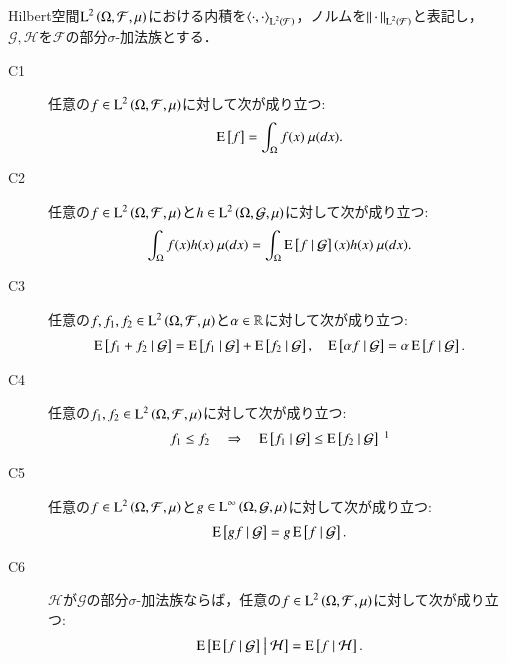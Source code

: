 	\begin{itembox}[l]{}
	\begin{prp}[条件付き期待値作用素の性質]
		Hilbert空間$\operatorname{L}^{2} \left(\Omega, \mathcal{F},\mu\right)$における内積を$\inprod<\cdot,\cdot>_{\Lp{2}{\mathcal{F}}}$，ノルムを$\left\|\, \cdot\, \right\|_{\operatorname{L}^{2} \left(\mathcal{F}\right)}$と表記し，
		$\mathcal{G},\mathcal{H}$を$\mathcal{F}$の部分$\sigma$-加法族とする．
		\begin{description}
			\item[C1] 任意の$f \in \operatorname{L}^{2} \left(\Omega, \mathcal{F},\mu\right)$に対して次が成り立つ:
				\begin{align}
					\operatorname{E} \left[ f \right] = \int_{\Omega} f(x)\ \mu(dx).
				\end{align}
				
			\item[C2]	任意の$f \in \operatorname{L}^{2} \left(\Omega, \mathcal{F},\mu\right)$と$h \in \operatorname{L}^{2} \left(\Omega, \mathcal{G},\mu\right)$に対して次が成り立つ:
				\begin{align}
					\int_{\Omega} f(x)h(x)\ \mu(dx) = \int_{\Omega} \operatorname{E} \left[ f \ \middle|\ \mathcal{G} \right](x)h(x)\ \mu(dx).
				\end{align}
				
			\item[C3]	任意の$f,f_1,f_2 \in \operatorname{L}^{2} \left(\Omega, \mathcal{F},\mu\right)$と$\alpha \in \mathbb{R}$に対して次が成り立つ:
				\begin{align}
					\operatorname{E} \left[ f_1 + f_2 \ \middle|\ \mathcal{G} \right] = \operatorname{E} \left[ f_1 \ \middle|\ \mathcal{G} \right] + \operatorname{E} \left[ f_2 \ \middle|\ \mathcal{G} \right],
					\quad \operatorname{E} \left[ \alpha f \ \middle|\ \mathcal{G} \right] = \alpha \operatorname{E} \left[ f \ \middle|\ \mathcal{G} \right].
				\end{align}

			\item[C4]	任意の$f_1,f_2 \in \operatorname{L}^{2} \left(\Omega, \mathcal{F},\mu\right)$に対して次が成り立つ:
				\begin{align}
					f_1 \leq f_2 \quad \Rightarrow \quad \cexp{f_1}{\mathcal{G}} \leq \cexp{f_2}{\mathcal{G}} \ \footnotemark
				\end{align}
			
			\item[C5]	任意の$f \in \operatorname{L}^{2} \left(\Omega, \mathcal{F},\mu\right)$と$g \in \operatorname{L}^{\infty} \left(\Omega, \mathcal{G},\mu\right)$に対して次が成り立つ:
				\begin{align}
					\operatorname{E} \left[ gf \ \middle|\ \mathcal{G} \right] = g\operatorname{E} \left[ f \ \middle|\ \mathcal{G} \right].
				\end{align}
			
			\item[C6]	$\mathcal{H}$が$\mathcal{G}$の部分$\sigma$-加法族ならば，任意の$f \in \operatorname{L}^{2} \left(\Omega, \mathcal{F},\mu\right)$に対して次が成り立つ:
				\begin{align}
					\operatorname{E} \left[ \operatorname{E} \left[ f \ \middle|\ \mathcal{G} \right] \ \middle|\ \mathcal{H} \right] = \operatorname{E} \left[ f \ \middle|\ \mathcal{H} \right].
				\end{align}
		\end{description}
		\label{prp:L2_conditional_expectation}
	\end{prp}
	\end{itembox}
	
